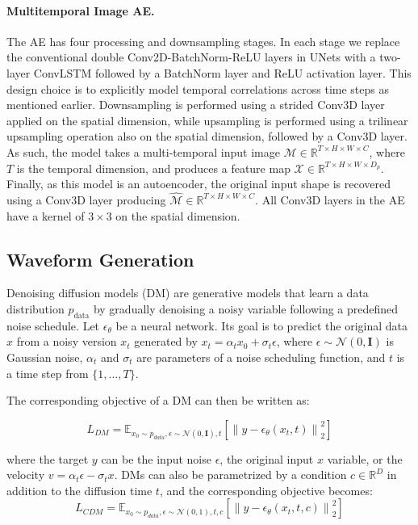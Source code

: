 \paragraph{Multitemporal Image AE.} The AE has four processing and downsampling stages. In each stage we replace the conventional double Conv2D-BatchNorm-ReLU layers in UNets with a two-layer ConvLSTM followed by a BatchNorm layer and ReLU activation layer. This design choice is to explicitly model temporal correlations across time steps as mentioned earlier. Downsampling is performed using a strided Conv3D layer applied on the spatial dimension, while upsampling is performed using a trilinear upsampling operation also on the spatial dimension, followed by a Conv3D layer. As such, the model takes a multi-temporal input image $\mathcal{M} \in \mathbb{R}^{T \times H \times W \times C}$, where $T$ is the temporal dimension, and produces a feature map $\mathcal{X} \in \mathbb{R}^{T \times H \times W \times D_p}$. Finally, as this model is an autoencoder, the original input shape is recovered using a Conv3D layer producing $\mathcal{\hat{M}} \in \mathbb{R}^{T \times H \times W \times C}$. All Conv3D layers in the AE have a kernel of $3 \times 3$ on the spatial dimension.

\subsection{Waveform Generation}\label{appendix:diffusion_math}
Denoising diffusion models (DM) \cite{sohl2015dm} are generative models that learn a data distribution \( p_{\text{data}} \) by gradually denoising a noisy variable following a predefined noise schedule. Let \( \epsilon_\theta \) be a neural network. Its goal is to predict the original data \( x \) from a noisy version \( x_t \) generated by \( x_t = \alpha_t x_0 + \sigma_t \epsilon \), where \( \epsilon \sim \mathcal{N}(0, \mathbf{I}) \) is Gaussian noise, \( \alpha_t \) and \( \sigma_t \) are parameters of a noise scheduling function, and $t$ is a time step from $\{1,...,T\}$. 


The corresponding objective of a DM can then be written as:

\begin{equation}
    L_{DM} = \mathbb{E}_{x_0 \sim p_{data}, \epsilon \sim \mathcal{N}(0,\mathbf{I}), t} \left[ \left\| y - \epsilon_\theta(x_t, t) \right\|_2^2 \right]
\end{equation}

where the target $y$ can be the input noise $\epsilon$, the original input $x$ variable, or the velocity $v = \alpha_t \epsilon - \sigma_t x$. DMs can also be parametrized by a condition $c \in \mathbb{R}^D$ in addition to the diffusion time $t$, and the corresponding objective becomes:
\begin{equation}
    L_{CDM} = \mathbb{E}_{x_0 \sim p_{data}, \epsilon \sim \mathcal{N}(0,1), t,c} \left[ \left\| y - \epsilon_\theta(x_t, t,c) \right\|_2^2 \right]
\end{equation}

